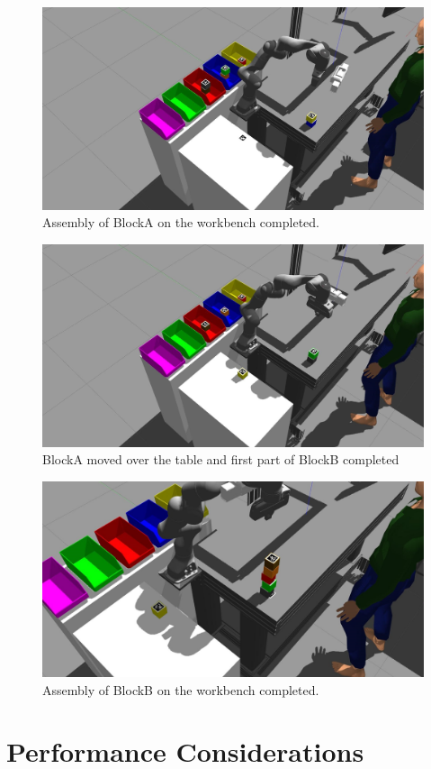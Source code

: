 \begin{figure} [!htbp]
\centering
\includegraphics[width=0.6
\textwidth]{figures/Magistrale/ass_2}
\caption[BlockA Assembly Simulation]{Assembly of BlockA on the workbench completed. 
\label{fig:ass_2}}
\end{figure} 

\begin{figure} [!htbp]
\centering
\includegraphics[width=0.6
\textwidth]{figures/Magistrale/ass_3}
\caption[First Part of BlockB Assembly Simulation]{BlockA moved over the table and first part of BlockB completed
\label{fig:ass_3}}
\end{figure} 

\begin{figure} [!htbp]
\centering
\includegraphics[width=0.6
\textwidth]{figures/Magistrale/ass_4}
\caption[Second Part of BlockB Assembly Simulation]{Assembly of BlockB on the workbench completed. 
\label{fig:ass_4}}
\end{figure} 


\section{Performance Considerations}\label{sec:perf_consid}


